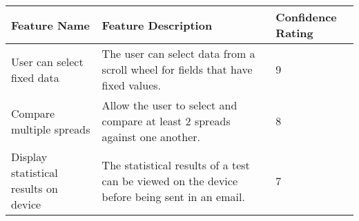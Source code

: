 \documentclass[11pt]{article}
\begin{document}
\begin{center}
\begin{tabular}{| p{4cm} | p{9cm} | p{2cm} |}\hline
\textbf{Feature Name} & \textbf{Feature Description} & \textbf{Confidence Rating}\\\hline\hline
User can select fixed data & The user can select data from a scroll wheel for fields that have fixed values. & 9\\\hline
Compare multiple spreads & Allow the user to select and compare at least 2 spreads against one another. & 8\\\hline
Display statistical results on device & The statistical results of a test can be viewed on the device before being sent in an email. & 7 \\\hline
\hline
\end{tabular}
\end{center}
\end{document}
